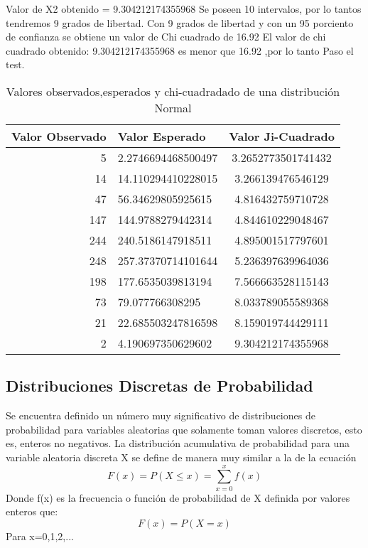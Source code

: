 \documentclass{article}
\begin{document}
  Valor de X2 obtenido = 9.304212174355968
  Se poseen 10 intervalos, por lo tantos tendremos 9 grados de libertad.
  Con 9 grados de libertad y con un 95 porciento de confianza se obtiene un valor de Chi cuadrado de 16.92
  El valor de chi cuadrado obtenido: 9.304212174355968 es menor que 16.92 ,por lo tanto Paso el test.
  \begin{table}[h]
    \begin{center}
      \begin{tabular}{| r | l | c |} \hline
      Valor Observado & Valor Esperado &  Valor Ji-Cuadrado \\ \hline
      5 & 2.2746694468500497 & 3.2652773501741432 \\
      14 & 14.110294410228015 & 3.266139476546129 \\
      47 & 56.34629805925615 & 4.816432759710728 \\
      147 & 144.9788279442314 & 4.844610229048467 \\
      244 & 240.5186147918511 & 4.895001517797601 \\
      248 & 257.37370714101644 & 5.236397639964036 \\
      198 & 177.6535039813194 & 7.566663528115143 \\
      73 & 79.077766308295 & 8.033789055589368 \\
      21 & 22.685503247816598 & 8.159019744429111 \\
      2 & 4.190697350629602 & 9.304212174355968 \\ \hline
      \end{tabular}
      \caption{Valores observados,esperados y chi-cuadradado de una distribución Normal}
    \end{center}
  \end{table}



  \subsection{Distribuciones Discretas de Probabilidad}
  Se encuentra definido un número muy significativo de distribuciones de probabilidad para variables aleatorias que solamente toman valores discretos, esto es, enteros no negativos. La distribución acumulativa de probabilidad para una variable aleatoria discreta X se define de manera muy similar a la de la ecuación
  \begin{equation}
    F(x) = P(X \leq x) = \sum_{x=0}^{x}f(x)
    \end{equation}
  Donde f(x) es la frecuencia o función de probabilidad de X definida por valores enteros que:
  \begin{equation}
    F(x) = P(X= x)
  \end{equation}
  Para x=0,1,2,...
\end{document}
